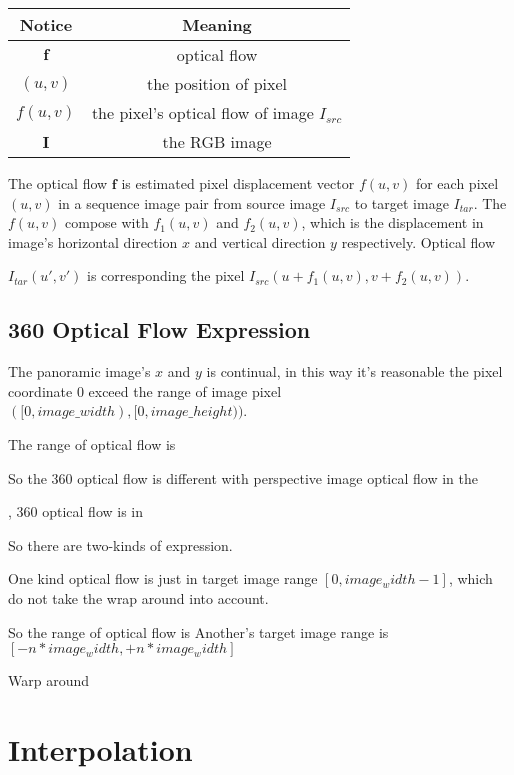 \begin{center}
	\begin{tabular}{ c | c } 
		\hline
		Notice & Meaning  \\ [0.5ex] 
		\hline\hline
		$\textbf{f}$ & optical flow  \\ 
		\hline
		$(u,v)$ & the position of pixel   \\
		\hline
		$f(u,v)$ & the pixel's optical flow of image $I_{src}$ \\
		\hline
		$\textbf{I}$ & the RGB image  \\ [1ex] 
		\hline
	\end{tabular}
\end{center}

The optical flow $\textbf{f}$ is estimated pixel displacement vector $f(u,v)$ for each pixel $(u,v)$ in a sequence image pair from source image $I_{src}$ to target image $I_{tar}$.
The $f(u,v)$ compose with $f_1(u,v)$ and $f_2(u,v)$, which is the displacement in image's horizontal direction $x$ and vertical direction $y$ respectively.
Optical flow 

$I_{tar}(u',v')$ is corresponding the pixel $I_{src}(u + f_1(u,v), v + f_2(u,v))$.


\subsection{360 Optical Flow Expression}

The panoramic image's $x$ and $y$ is continual, in this way it's reasonable the pixel coordinate 0 exceed the range of image pixel $([0, image\_width), [0, image\_height))$. 

The range of optical flow is 

So the 360 optical flow is different with perspective image optical flow in the 

, 360 optical flow is  in 

So there are two-kinds of expression.

One kind optical flow is just in target image range $[0, image_width - 1]$, which do not take the wrap around into account.

So the range of optical flow is 
Another's target image range is $[- n * image_width, + n * image_width]$

Warp around


\section{Interpolation}


